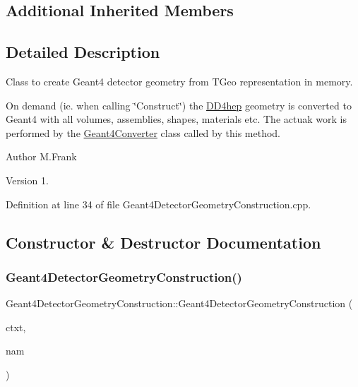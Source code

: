 \subsection*{Additional Inherited Members}


\subsection{Detailed Description}
Class to create Geant4 detector geometry from T\+Geo representation in memory. 

On demand (ie. when calling \char`\"{}\+Construct\char`\"{}) the \hyperlink{namespace_d_d4hep}{D\+D4hep} geometry is converted to Geant4 with all volumes, assemblies, shapes, materials etc. The actuak work is performed by the \hyperlink{class_d_d4hep_1_1_simulation_1_1_geant4_converter}{Geant4\+Converter} class called by this method.

\begin{DoxyAuthor}{Author}
M.\+Frank 
\end{DoxyAuthor}
\begin{DoxyVersion}{Version}
1. 
\end{DoxyVersion}


Definition at line 34 of file Geant4\+Detector\+Geometry\+Construction.\+cpp.



\subsection{Constructor \& Destructor Documentation}
\hypertarget{class_d_d4hep_1_1_simulation_1_1_geant4_detector_geometry_construction_a877334f0a23cdc4e7a80a34c15974f4d}{}\label{class_d_d4hep_1_1_simulation_1_1_geant4_detector_geometry_construction_a877334f0a23cdc4e7a80a34c15974f4d} 
\subsubsection{\texorpdfstring{Geant4\+Detector\+Geometry\+Construction()}{Geant4DetectorGeometryConstruction()}}
{\footnotesize\ttfamily Geant4\+Detector\+Geometry\+Construction\+::\+Geant4\+Detector\+Geometry\+Construction (\begin{DoxyParamCaption}\item[{\hyperlink{class_d_d4hep_1_1_simulation_1_1_geant4_context}{Geant4\+Context} $\ast$}]{ctxt,  }\item[{const std\+::string \&}]{nam }\end{DoxyParamCaption})}




